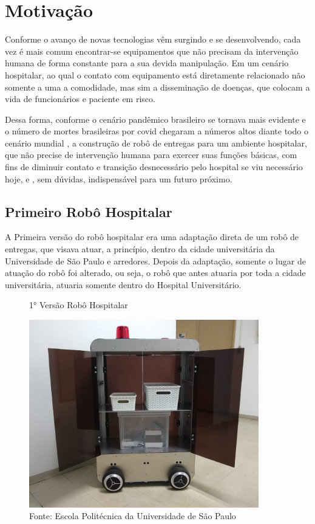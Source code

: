 \documentclass[../poliXuniversity_hospital_-USP-report.tex]{subfiles}
\begin{document}
\chapter{Motivação}

Conforme o avanço de novas tecnologias vêm surgindo e se desenvolvendo, cada vez é mais comum encontrar-se equipamentos que não precisam da intervenção humana de forma constante para  a sua devida manipulação. Em um cenário hospitalar, ao qual o contato com equipamento está diretamente relacionado não somente a uma a comodidade, mas sim a disseminação de doenças, que colocam a vida de funcionários e paciente em risco.

Dessa forma, conforme o cenário pandêmico brasileiro se tornava mais evidente \cite{covid2020} e o número de mortes brasileiras por covid chegaram a números altos diante todo o cenário mundial \cite{mortes_covid21}, a construção de robô de entregas para um ambiente hospitalar, que não precise de intervenção humana para exercer suas funções básicas, com fins de diminuir contato e transição desnecessário pelo hospital se viu necessário hoje, e , sem dúvidas, indispensável para um futuro próximo.

\section{Primeiro Robô Hospitalar}

A Primeira versão do robô hospitalar era uma adaptação direta de um robô de entregas, que visava atuar, a princípio, dentro da cidade universitária da Universidade de São Paulo e arredores. Depois da adaptação, somente o lugar de atuação do robô foi alterado, ou seja, o robô que antes atuaria por toda a cidade universitária, atuaria somente dentro do Hospital Universitário.

\begin{figure}[h]
\centering
    \caption{1° Versão Robô Hospitalar}
    \centering %
    \includegraphics[width=10cm]{v1_robo_hospitalar.jpeg}
    \caption*{Fonte: Escola Politécnica da Universidade de São Paulo}
    \label{figura:1° Versão Robô Hospitalar}
\end{figure}
\end{document}
